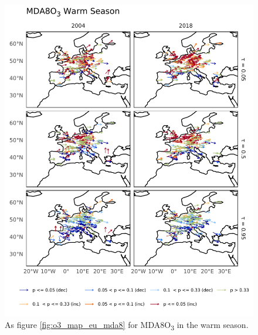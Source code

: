 \documentclass[journal abbreviation, manuscript]{copernicus}
\begin{document}
\begin{figure}[h!]
\centering
\includegraphics[height=0.9\textheight]{figures/paper_figures/o3_map/o3_map_piecewise_stats_freeTau_mda8_anom_warm_eu_o3.pdf}
\caption{As figure \ref{fig:o3_map_eu_mda8} for MDA8O\textsubscript{3} in the warm season.}
\label{fig:o3_map_eu_mda8_warm}
\end{figure}
\end{document}
